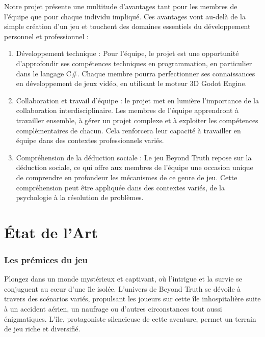 \documentclass[
	article,			%
	11pt,				%
	oneside,			%
	a4paper,			%
	chapter=TITLE,
	french,			%
	sumario=tradicional
	]{base_nt}
\begin{document}
Notre projet présente une multitude d'avantages tant pour les membres de l'équipe que pour chaque individu impliqué. Ces avantages vont au-delà de la simple création d'un jeu et touchent des domaines essentiels du développement personnel et professionnel :

\begin{enumerate}
    \item Développement technique : Pour l'équipe, le projet est une opportunité d'approfondir ses compétences techniques en programmation, en particulier dans le langage C\#. Chaque membre pourra perfectionner ses connaissances en développement de jeux vidéo, en utilisant le moteur 3D Godot Engine.

    \item Collaboration et travail d'équipe : le projet met en lumière l'importance de la collaboration interdisciplinaire. Les membres de l'équipe apprendront à travailler ensemble, à gérer un projet complexe et à exploiter les compétences complémentaires de chacun. Cela renforcera leur capacité à travailler en équipe dans des contextes professionnels variés.

    \item Compréhension de la déduction sociale : Le jeu Beyond Truth repose sur la déduction sociale, ce qui offre aux membres de l'équipe une occasion unique de comprendre en profondeur les mécanismes de ce genre de jeu. Cette compréhension peut être appliquée dans des contextes variés, de la psychologie à la résolution de problèmes.

\end{enumerate}

\part{État de l'Art}

\section{Les prémices du jeu}

Plongez dans un monde mystérieux et captivant, où l'intrigue et la survie se conjuguent au cœur d'une île isolée. L'univers de Beyond Truth se dévoile à travers des scénarios variés, propulsant les joueurs sur cette île inhospitalière suite à un accident aérien, un naufrage ou d'autres circonstances tout aussi énigmatiques. L'île, protagoniste silencieuse de cette aventure, permet un terrain de jeu riche et diversifié.
\end{document}
